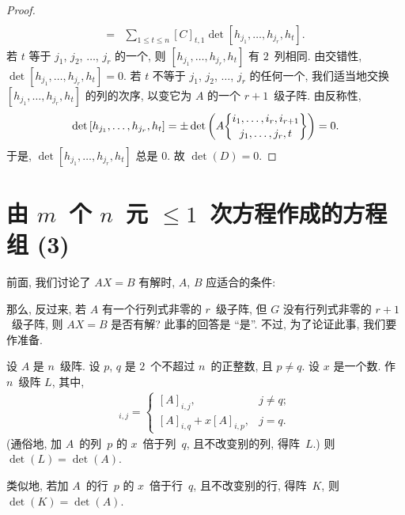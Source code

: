 \documentclass[../libro.tex]{subfiles}
\begin{document}
\begin{proof}
\begin{align*}
{        }
        \\
        = {} &
        \sum_{1 \leq t \leq n}
        {
            [C]_{t,1} \det {[h_{j_1}, \dots, h_{j_r}, h_t]}
        }.
    \end{align*}
    若 \(t\) 等于 \(j_1\), \(j_2\), \(\dots\), \(j_r\) 的一个,
    则 \([h_{j_1}, \dots, h_{j_r}, h_t]\) 有 \(2\)~列相同.
    由交错性, \(\det {[h_{j_1}, \dots, h_{j_r}, h_t]} = 0\).
    若 \(t\) 不等于 \(j_1\), \(j_2\), \(\dots\), \(j_r\) 的任何一个,
    我们适当地交换 \([h_{j_1}, \dots, h_{j_r}, h_t]\) 的列的次序,
    以变它为 \(A\) 的一个 \(r+1\)~级子阵.
    由反称性,
    \begin{align*}
        \det {[h_{j_1}, \dots, h_{j_r}, h_t]}
        = \pm
        \det {\left(
                A\submat{i_1,\dots,i_r,i_{r+1}}{j_1,\dots,j_r,t}
        \right)}
        = 0.
    \end{align*}
    于是, \(\det {[h_{j_1}, \dots, h_{j_r}, h_t]}\) 总是 \(0\).
    故 \(\det {(D)} = 0\).
\end{proof}

\KunAsteriskoEnEnhavtabelo
\section{\texorpdfstring{由 \(m\)~个 \(n\)~元
    \({\leq} 1\)~次方程作成的方程组 (3)}%
{由 m 个 n 元 ≤1 次方程作成的方程组 (3)}}
\SenAsteriskoEnEnhavtabelo

\maldevigalegajxo

前面, 我们讨论了
\(AX = B\) 有解时,
\(A\), \(B\) 应适合的条件:

\TheoremNecessityForConsistency*

那么, 反过来,
若 \(A\) 有一个行列式非零的 \(r\)~级子阵,
但 \(G\) 没有行列式非零的 \(r+1\)~级子阵,
则 \(AX = B\) 是否有解?
此事的回答是 ``是''.
不过, 为了论证此事,
我们要作准备.

\begin{theorem}
    设 \(A\) 是 \(n\)~级阵.
    设 \(p\), \(q\) 是 \(2\)~个不超过 \(n\)~的正整数,
    且 \(p \neq q\).
    设 \(x\) 是一个数.
    作 \(n\)~级阵 \(L\), 其中,
    \begin{align*}
        [L]_{i,j} =
        \begin{cases}
            [A]_{i,j},              & j \neq q; \\
            [A]_{i,q} + x[A]_{i,p}, & j = q.
        \end{cases}
    \end{align*}
    (通俗地, %
    加 \(A\)~的列~\(p\) 的 \(x\)~倍于列~\(q\),
    且不改变别的列,
    得阵~\(L\).) %
    则 \(\det {(L)} = \det {(A)}\).

    类似地,
    若加 \(A\)~的行~\(p\) 的 \(x\)~倍于行~\(q\),
    且不改变别的行,
    得阵~\(K\),
    则 \(\det {(K)} = \det {(A)}\).
\end{theorem}
\end{document}
